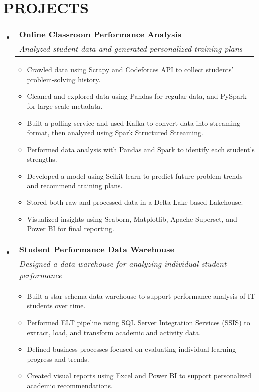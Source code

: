 \documentclass[letterpaper,11pt]{article}
\makeatletter
\newcommand{\resumeItem}[1]{
  \item\small{
    {#1 \vspace{-1pt}}
  }
}
\newcommand{\resumeSubheading}[4]{
  \vspace{-2pt}\item
    \begin{tabular*}{1.0\textwidth}[t]{l@{\extracolsep{\fill}}r}
      \textbf{\large#1} & \textbf{\small #2} \\
      \textit{\large#3} & \textit{\small #4} \\
      
    \end{tabular*}\vspace{-7pt}
}
\newcommand{\resumeSubHeadingListStart}{\begin{itemize}[leftmargin=0.0in, label={}]}
\newcommand{\resumeSubHeadingListEnd}{\end{itemize}}
\newcommand{\resumeItemListStart}{\begin{itemize}[leftmargin=0.1in]}
\newcommand{\resumeItemListEnd}{\end{itemize}\vspace{-5pt}}
\makeatother
\begin{document}
\section{\color{airforceblue}PROJECTS}
    \resumeSubHeadingListStart
    
\resumeSubheading
  {Online Classroom Performance Analysis}{} 
  {Analyzed student data and generated personalized training plans}{} 
  \resumeItemListStart
    \resumeItem{\normalsize{Crawled data using Scrapy and Codeforces API to collect students' problem-solving history.}} 
    \vspace{1pt}
    \resumeItem{\normalsize{Cleaned and explored data using Pandas for regular data, and PySpark for large-scale metadata.}} 
    \vspace{1pt}
    \resumeItem{\normalsize{Built a polling service and used Kafka to convert data into streaming format, then analyzed using Spark Structured Streaming.}} 
    \vspace{1pt}
    \resumeItem{\normalsize{Performed data analysis with Pandas and Spark to identify each student’s strengths.}} 
    \vspace{1pt}
    \resumeItem{\normalsize{Developed a model using Scikit-learn to predict future problem trends and recommend training plans.}} 
    \vspace{1pt}
    \resumeItem{\normalsize{Stored both raw and processed data in a Delta Lake-based Lakehouse.}} 
    \vspace{1pt}
    \resumeItem{\normalsize{Visualized insights using Seaborn, Matplotlib, Apache Superset, and Power BI for final reporting.}} 
  \resumeItemListEnd

\vspace{5pt}

  \resumeSubheading
  {Student Performance Data Warehouse}{} 
  {Designed a data warehouse for analyzing individual student performance}{} 
  \resumeItemListStart
    \resumeItem{\normalsize{Built a star-schema data warehouse to support performance analysis of IT students over time.}} 
    \vspace{1pt}
    \resumeItem{\normalsize{Performed ELT pipeline using SQL Server Integration Services (SSIS) to extract, load, and transform academic and activity data.}} 
    \vspace{1pt}
    \resumeItem{\normalsize{Defined business processes focused on evaluating individual learning progress and trends.}} 
    \vspace{1pt}
    \resumeItem{\normalsize{Created visual reports using Excel and Power BI to support personalized academic recommendations.}} 
  \resumeItemListEnd



  \resumeSubHeadingListEnd
\vspace{-8pt}
\end{document}
